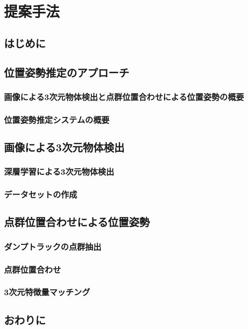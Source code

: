 \chapter{提案手法}
\thispagestyle{empty}
\label{chap2}
\minitoc

\newpage
\section{はじめに}
\section{位置姿勢推定のアプローチ}
\subsection{画像による3次元物体検出と点群位置合わせによる位置姿勢の概要}
\subsection{位置姿勢推定システムの概要}
\section{画像による3次元物体検出}
\subsection{深層学習による3次元物体検出}
\subsection{データセットの作成}
\section{点群位置合わせによる位置姿勢}
\subsection{ダンプトラックの点群抽出}
\subsection{点群位置合わせ}
\subsection{3次元特徴量マッチング}
\section{おわりに}
